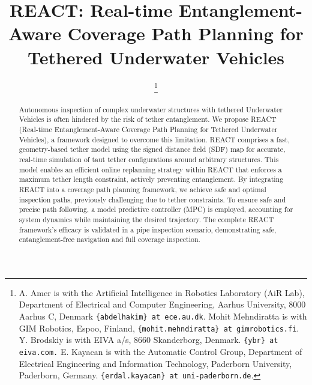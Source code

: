 \documentclass[letterpaper, 10 pt, conference]{ieeetran}  %
\begin{document}
%

\title{REACT: Real-time Entanglement-Aware Coverage Path Planning for Tethered Underwater Vehicles}

\author{
\thanks{A. Amer is with the Artificial Intelligence in Robotics Laboratory (AiR Lab), Department of Electrical and Computer Engineering, Aarhus University, 8000 Aarhus C, Denmark {\tt\small \{abdelhakim\} at ece.au.dk}.    Mohit Mehndiratta is with GIM Robotics, Espoo, Finland, {\tt\small \{mohit.mehndiratta\} at gimrobotics.fi}.
     Y. Brodskiy is with EIVA a/s, 8660 Skanderborg, Denmark. {\tt\small \{ybr\} at eiva.com.}
    E. Kayacan is with the Automatic Control Group, Department of Electrical Engineering and Information Technology, Paderborn University, Paderborn, Germany. {\tt\small \{erdal.kayacan\} at uni-paderborn.de}.}%
}

\maketitle
\begin{abstract}
Autonomous inspection of complex underwater structures with tethered Underwater Vehicles is often hindered by the risk of tether entanglement. We propose REACT (Real-time Entanglement-Aware Coverage Path Planning for Tethered Underwater Vehicles), a framework designed to overcome this limitation. REACT comprises a fast, geometry-based tether model using the signed distance field (SDF) map for accurate, real-time simulation of taut tether configurations around arbitrary structures. This model enables an efficient online replanning strategy within REACT that enforces a maximum tether length constraint, actively preventing entanglement. By integrating REACT into a coverage path planning framework, we achieve safe and optimal inspection paths, previously challenging due to tether constraints. To ensure safe and precise path following, a model predictive controller (MPC) is employed, accounting for system dynamics while maintaining the desired trajectory. The complete REACT framework's efficacy is validated in a pipe inspection scenario, demonstrating safe, entanglement-free navigation and full coverage inspection.









\end{abstract}
\end{document}
